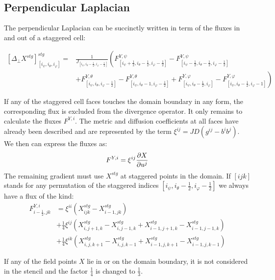 \subsection{Perpendicular Laplacian}

The perpendicular Laplacian can be succinctly written in term of the fluxes in and out of a staggered cell:

\begin{align}
	\left[\Delta_{\perp}X^{stg}\right]^{stg}_{[i_\psi,i_\theta, i_\varphi]} =& \frac{1}{J_{[i_\psi,i_\theta-\frac{1}{2}, i_\varphi-\frac{1}{2}]}}\left(F^{Y,\psi}_{[i_\psi+\frac{1}{2},i_\theta-\frac{1}{2}, i_\varphi-\frac{1}{2}]} - F^{Y,\psi}_{[i_\psi-\frac{1}{2},i_\theta-\frac{1}{2}, i_\varphi-\frac{1}{2}]}\right. \nonumber \\ 
	&\left.+ F^{Y,\theta}_{[i_\psi,i_\theta, i_\varphi-\frac{1}{2}]} - F^{Y,\theta}_{[i_\psi,i_\theta-1, i_\varphi-\frac{1}{2}]}+ F^{Y,\varphi}_{[i_\psi,i_\theta-\frac{1}{2}, i_\varphi]} - F^{Y,\varphi}_{[i_\psi,i_\theta-\frac{1}{2}, i_\varphi-1]}\right) 	\label{eq:NumericalStaggeredPerpDiffStencil}	
\end{align}

If any of the staggered cell faces touches the domain boundary in any form, the corresponding flux is excluded from the divergence operator. It only remains to calculate the fluxes $F^{Y,i}$. The metric and diffusion coefficients at all faces have already been described and are represented by the term $\xi^{ij}=JD(g^{ij}-b^ib^j)$. We then can express the fluxes as: 
$$ F^{Y,i} = \xi^{ij}\pdv{X}{u^j} $$
The remaining gradient must use $X^{stg}$ at staggered points in the domain. If $[ijk]$ stands for any permutation of the staggered indices $[i_\psi,i_\theta-\frac{1}{2},i_\varphi-\frac{1}{2}]$ we always have a flux of the kind:
\begin{align*}
	F^{Y,i}_{i-\frac{1}{2},jk} &= \xi^{ii}\left(X^{stg}_{ijk}-X^{stg}_{i-1,jk}\right) \\
	&+ \frac{1}{4}\xi^{ij}\left(X^{stg}_{i,j+1,k}-X^{stg}_{i,j-1,k}+X^{stg}_{i-1,j+1,k}-X^{stg}_{i-1,j-1,k}\right) \\
	&+ \frac{1}{4}\xi^{ik}\left(X^{stg}_{i,j,k+1}-X^{stg}_{i,j,k-1}+X^{stg}_{i-1,j,k+1}-X^{stg}_{i-1,j,k-1}\right)
\end{align*}

If any of the field points $X$ lie in or on the domain boundary, it is not considered in the stencil and the factor $\frac{1}{4}$ is changed to $\frac{1}{3}$.




